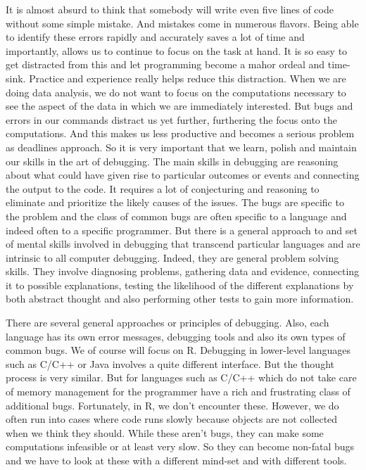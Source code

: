 It is almost absurd to think that somebody will write even five lines
of code without some simple mistake. And mistakes come in numerous
flavors. Being able to identify these errors rapidly and accurately
saves a lot of time and importantly, allows us to continue to focus on
the task at hand.  It is so easy to get distracted from this and let
programming become a mahor ordeal and time-sink. Practice and
experience really helps reduce this distraction. When we are doing
data analysis, we do not want to focus on the computations necessary
to see the aspect of the data in which we are immediately
interested. But bugs and errors in our commands distract us yet
further, furthering the focus onto the computations.  And this makes
us less productive and becomes a serious problem as deadlines
approach.  So it is very important that we learn, polish and maintain
our skills in the art of debugging.  The main skills in debugging are
reasoning about what could have given rise to particular outcomes or
events and connecting the output to the code.  It requires a lot of
conjecturing and reasoning to eliminate and prioritize the likely
causes of the issues.  The bugs are specific to the problem and the
class of common bugs are often specific to a language and indeed often
to a specific programmer. But there is a general approach to and set
of mental skills involved in debugging that transcend particular
languages and are intrinsic to all computer debugging. Indeed, they
are general problem solving skills. They involve diagnosing problems,
gathering data and evidence, connecting it to possible explanations,
testing the likelihood of the different explanations by both abstract
thought and also performing other tests to gain more information.

There are several general approaches or principles of debugging.
Also, each language has its own error messages, debugging tools and
also its own types of common bugs. We of course will focus on R.
Debugging in lower-level languages such as C/C++ or Java involves a
quite different interface. But the thought process is very
similar. But for languages such as C/C++ which do not take care of
memory management for the programmer have a rich and frustrating class
of additional bugs. Fortunately, in R, we don't encounter these.
However, we do often run into cases where code runs slowly because
objects are not collected when we think they should. While these
aren't bugs, they can make some computations infeasible or at least
very slow. So they can become non-fatal bugs and we have to look at
these with a different  mind-set and with different tools.


